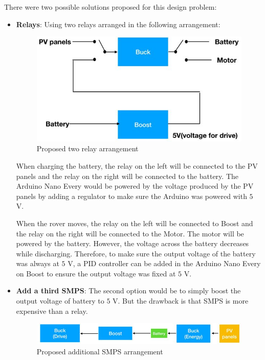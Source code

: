 \documentclass[11pt, a4paper]{article}
\begin{document}
There were two possible solutions proposed for this design problem:
\begin{itemize}
    \item \textbf{Relays}: Using two relays arranged in the following arrangement:
    \begin{figure} [h!]
        \centering
        \includegraphics[scale=0.5]{Energy_int.JPG}
        \caption{Proposed two relay arrangement}
    \end{figure}

    When charging the battery, the relay on the left will be connected to the PV panels and the relay on the right will be connected to the battery. The Arduino Nano Every would be powered by the voltage produced by the PV panels by adding a regulator to make sure the Arduino was powered with $5$ V.

    When the rover moves, the relay on the left will be connected to Boost and the relay on the right will be connected to the Motor. The motor will be powered by the battery. However, the voltage across the battery decreases while discharging. Therefore, to make sure the output voltage of the battery was always at $5$ V, a PID controller can be added in the Arduino Nano Every on Boost to ensure the output voltage was fixed at $5$ V.
    
    \item \textbf{Add a third SMPS}: The second option would be to simply boost the output voltage of battery to $5$ V. But the drawback is that SMPS is more expensive than a relay.
    \begin{figure} [h!]
        \centering
        \includegraphics[scale=0.6]{Energy_int2.JPG}
        \caption{Proposed additional SMPS arrangement}
    \end{figure}
    
\end{itemize}
\end{document}
